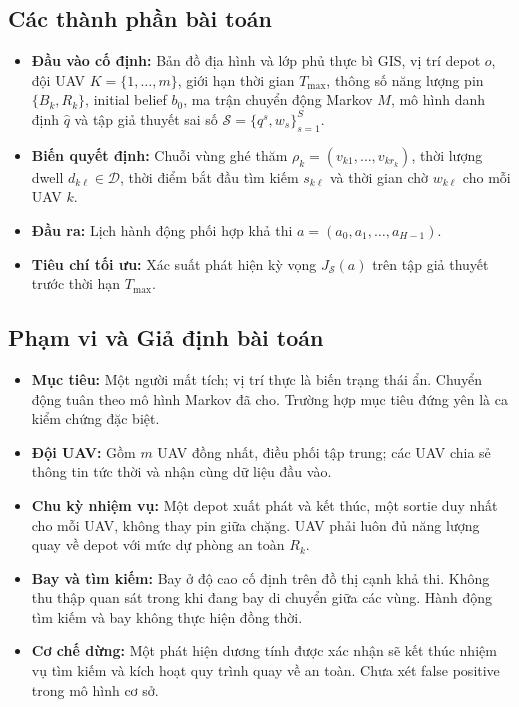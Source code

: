 \documentclass[12pt,a4paper]{article}
\begin{document}
\subsection{Các thành phần bài toán}

\begin{itemize}
    \item \textbf{Đầu vào cố định:} Bản đồ địa hình và lớp phủ thực bì GIS, vị trí depot $o$, đội UAV $K=\{1,\ldots,m\}$, giới hạn thời gian $T_{\max}$, thông số năng lượng pin $\{B_k, R_k\}$, initial belief $b_0$, ma trận chuyển động Markov $M$, mô hình danh định $\widehat q$ và tập giả thuyết sai số $\mathcal{S} = \{q^s, w_s\}_{s=1}^S$.
    \item \textbf{Biến quyết định:} Chuỗi vùng ghé thăm $\rho_k = (v_{k1}, \ldots, v_{kr_k})$, thời lượng dwell $d_{k\ell} \in \mathcal{D}$, thời điểm bắt đầu tìm kiếm $s_{k\ell}$ và thời gian chờ $w_{k\ell}$ cho mỗi UAV $k$.
    \item \textbf{Đầu ra:} Lịch hành động phối hợp khả thi $a = (a_0, a_1, \ldots, a_{H-1})$.
    \item \textbf{Tiêu chí tối ưu:} Xác suất phát hiện kỳ vọng $J_{\mathcal{S}}(a)$ trên tập giả thuyết trước thời hạn $T_{\max}$.
\end{itemize}

\subsection{Phạm vi và Giả định bài toán}

\begin{itemize}
    \item \textbf{Mục tiêu:} Một người mất tích; vị trí thực là biến trạng thái ẩn. Chuyển động tuân theo mô hình Markov đã cho. Trường hợp mục tiêu đứng yên là ca kiểm chứng đặc biệt.
    \item \textbf{Đội UAV:} Gồm $m$ UAV đồng nhất, điều phối tập trung; các UAV chia sẻ thông tin tức thời và nhận cùng dữ liệu đầu vào.
    \item \textbf{Chu kỳ nhiệm vụ:} Một depot xuất phát và kết thúc, một sortie duy nhất cho mỗi UAV, không thay pin giữa chặng. UAV phải luôn đủ năng lượng quay về depot với mức dự phòng an toàn $R_k$.
    \item \textbf{Bay và tìm kiếm:} Bay ở độ cao cố định trên đồ thị cạnh khả thi. Không thu thập quan sát trong khi đang bay di chuyển giữa các vùng. Hành động tìm kiếm và bay không thực hiện đồng thời.
    \item \textbf{Cơ chế dừng:} Một phát hiện dương tính được xác nhận sẽ kết thúc nhiệm vụ tìm kiếm và kích hoạt quy trình quay về an toàn. Chưa xét false positive trong mô hình cơ sở.
\end{itemize}
\end{document}

